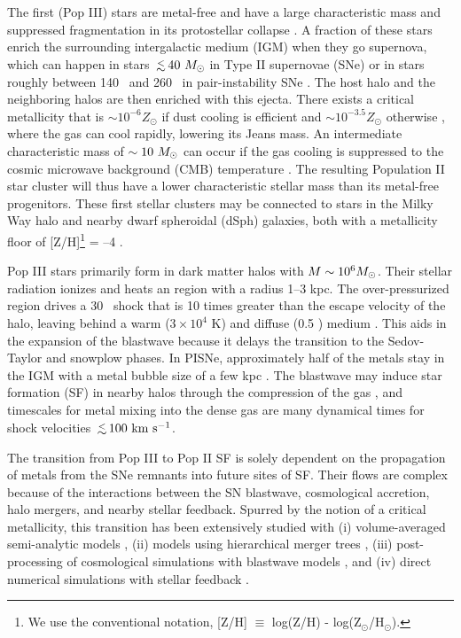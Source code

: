 \documentclass[12pt,preprint]{aastex}
\begin{document}
The first (Pop III) stars are metal-free and have a large
characteristic mass and suppressed fragmentation in its protostellar
collapse \citep{ABN02, Bromm02_P3, OShea07a}.  A fraction of these
stars enrich the surrounding intergalactic medium (IGM) when they go
supernova, which can happen in stars $\lsim 40~\Ms$ in Type II
supernovae (SNe) or in stars roughly between 140 \Ms~and 260 \Ms~in
pair-instability SNe \citep[PISNe;][]{2002ApJ...567..532H}.  The host
halo and the neighboring halos are then enriched with this ejecta.
There exists a critical metallicity that is $\sim 10^{-6} Z_\odot$ if
dust cooling is efficient \citep{Omukai05, Schneider06_Frag, clark08}
and $\sim 10^{-3.5} Z_\odot$ otherwise \citep{Bromm01,
  2009ApJ...691..441S}, where the gas can cool rapidly, lowering its
Jeans mass.  An intermediate characteristic mass of $\sim10~\Ms$ can
occur if the gas cooling is suppressed to the cosmic microwave
background (CMB) temperature \citep{Larson98, Tumlinson07_IMF,
  2009ApJ...691..441S}.  The resulting Population II star cluster will
thus have a lower characteristic stellar mass than its metal-free
progenitors.  These first stellar clusters may be connected to stars
in the Milky Way halo and nearby dwarf spheroidal (dSph) galaxies,
both with a metallicity floor of [Z/H]\footnote{We use the
  conventional notation, [Z/H] $\equiv$ log(Z/H) -
  log(Z$_\odot$/H$_\odot$).} = --4 \citep{Beers05, Frebel10_Obs,
  Tafelmeyer10}.

Pop III stars primarily form in dark matter halos with $M \sim 10^6
\Ms$.  Their stellar radiation ionizes and heats an  region
with a radius 1--3 kpc.  The over-pressurized  region drives
a 30 \kms~shock that is 10 times greater than the escape velocity of
the halo, leaving behind a warm ($3 \times 10^4$ K) and diffuse (0.5
\cubecm) medium \citep{Kitayama04, Whalen04, Abel07}.  This aids in
the expansion of the blastwave because it delays the transition to the
Sedov-Taylor and snowplow phases.  In PISNe, approximately half of the
metals stay in the IGM with a metal bubble size of a few kpc
\citep{Wise08_Gal, Greif10}.  The blastwave may induce star formation
(SF) in nearby halos through the compression of the gas
\citep{Ferrara98}, and timescales for metal mixing into the dense gas
are many dynamical times \citep{Cen08} for shock velocities
$\lsim100~\kms$.

The transition from Pop III to Pop II SF is solely dependent on the
propagation of metals from the SNe remnants into future sites of SF.
Their flows are complex because of the interactions between the SN
blastwave, cosmological accretion, halo mergers, and nearby stellar
feedback.  Spurred by the notion of a critical metallicity, this
transition has been extensively studied with (i) volume-averaged
semi-analytic models \citep{Scannapieco03, Yoshida04,
  Furlanetto05_Reion}, (ii) models using hierarchical merger trees
\citep{Tumlinson06, Tumlinson10, Salvadori07, Komiya10}, (iii)
post-processing of cosmological simulations with blastwave models
\citep{Karlsson08, Trenti09, Trenti10}, and (iv) direct numerical
simulations with stellar feedback \citep{Tornatore07, Ricotti08,
  Maio10_Pop32, Maio11_Enrich}.
\end{document}
